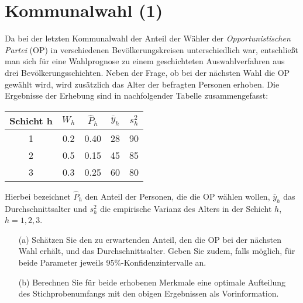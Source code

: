 \documentclass{article}
\begin{document}
\newpage
\section{Kommunalwahl (1)}
Da bei der letzten Kommunalwahl der Anteil der Wähler der \emph{Opportunistischen Partei} (OP) in verschiedenen Bevölkerungskreisen unterschiedlich war, entschließt man sich für eine Wahlprognose zu einem geschichteten Auswahlverfahren aus drei Bevölkerungsschichten. Neben der Frage, ob bei der nächsten Wahl die OP gewählt wird, wird zusätzlich das Alter der befragten Personen erhoben. Die Ergebnisse der Erhebung sind in nachfolgender Tabelle zusammengefasst:
\begin{center}
	\begin{tabular}{|c|c|c|c|c|}
		\noalign{\smallskip}\hline\noalign{\smallskip}
		Schicht h & $W_h$ & $\hat P_h$ & $\bar y_{h}$ & $s_{h}^2$ \\ \hline
		1 & 0.2 & 0.40 & 28 & 90 \\
		2 & 0.5 & 0.15 & 45 & 85 \\
		3 & 0.3 & 0.25 & 60 & 80 \\ \hline
	\end{tabular}
\end{center}
Hierbei bezeichnet $\hat P_h$ den Anteil der Personen, die die OP wählen wollen, $\bar y_{h}$ das Durchschnittsalter und
$s_h^2$ die empirische Varianz des Alters in der Schicht $h$, $h=1,2,3$.
\begin{enumerate}
	\item[(a)] Schätzen Sie den zu erwartenden Anteil, den die OP bei der nächsten Wahl erhält, und das Durchschnittsalter. Geben Sie zudem, falls möglich, für beide Parameter jeweils 95\%-Konfidenzintervalle an.
	\item[(b)] Berechnen Sie für beide erhobenen Merkmale eine optimale Aufteilung des Stichprobenumfangs
	mit den obigen Ergebnissen als Vorinformation.
\end{enumerate}
\end{document}
